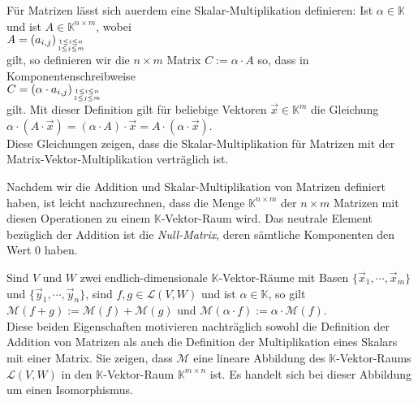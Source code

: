 F\"{u}r Matrizen l\"{a}sst sich au\3erdem eine Skalar-Multiplikation definieren:  Ist $\alpha \in \mathbb{K}$
und ist $A \in \mathbb{K}^{n \times m}$, wobei
\\[0.2cm]
\hspace*{1.3cm}
$A = (a_{i,j})_{1\leq i \leq n \atop 1 \leq j \leq m}$
\\[0.2cm]
gilt, so definieren wir die $n \times m$ Matrix 
$C := \alpha \cdot A$ so, dass in Komponentenschreibweise
\\[0.2cm]
\hspace*{1.3cm}
$C = (\alpha \cdot a_{i,j})_{1\leq i \leq n \atop 1 \leq j \leq m}$ 
\\[0.2cm]
gilt.  Mit
dieser Definition gilt f\"{u}r beliebige Vektoren $\vec{x} \in \mathbb{K}^m$ die Gleichung
\\[0.2cm]
\hspace*{1.3cm}
$\alpha \cdot (A \cdot \vec{x}) = (\alpha \cdot A) \cdot \vec{x} = A \cdot (\alpha \cdot \vec{x})$.
\\[0.2cm]
Diese Gleichungen zeigen, dass die Skalar-Multiplikation f\"{u}r Matrizen mit der Matrix-Vektor-Multiplikation   
vertr\"{a}glich ist.

\remark
Nachdem wir die Addition und Skalar-Multiplikation von Matrizen definiert haben, ist leicht
nachzurechnen, dass die Menge $\mathbb{K}^{n \times m}$ der $n \times m$ Matrizen mit diesen
Operationen zu einem $\mathbb{K}$-Vektor-Raum wird.  Das neutrale Element bez\"{u}glich der Addition ist die
\emph{\color{blue}Null-Matrix}, deren s\"{a}mtliche Komponenten den Wert $0$ haben.

\remark
Sind $V$ und $W$ zwei endlich-dimensionale $\mathbb{K}$-Vektor-R\"{a}ume mit Basen
$\{\vec{x}_1, \cdots, \vec{x}_m\}$ und $\{\vec{y}_1, \cdots, \vec{y}_n\}$, sind $f, g \in \mathcal{L}(V, W)$ und ist $\alpha \in \mathbb{K}$, so gilt
\\[0.2cm]
\hspace*{1.3cm}
$\mathcal{M}(f+g) := \mathcal{M}(f) + \mathcal{M}(g)$ \quad und \quad
$\mathcal{M}(\alpha \cdot f) := \alpha \cdot \mathcal{M}(f)$.
\\[0.2cm]
Diese beiden Eigenschaften motivieren nachtr\"{a}glich sowohl die Definition der Addition von Matrizen
als auch die Definition der Multiplikation eines Skalars mit einer Matrix.  
Sie zeigen, dass $\mathcal{M}$ eine lineare Abbildung des $\mathbb{K}$-Vektor-Raums $\mathcal{L}(V,W)$ in den $\mathbb{K}$-Vektor-Raum $\mathbb{K}^{m \times n}$ ist.  
Es handelt sich bei dieser Abbildung um einen Isomorphismus.
\eoxs
\pagebreak


